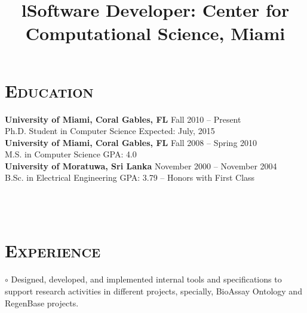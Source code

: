 \begin{resume}



\vspace{-5mm}
\section{\textsc{Education}}

\textbf{University of Miami, Coral Gables, FL} \hfill Fall 2010 -- Present \\
Ph.D. Student in Computer Science \hfill Expected: July, 2015 \\
\newline
\textbf{University of Miami, Coral Gables, FL} \hfill Fall 2008 -- Spring 2010 \\
M.S. in Computer Science \hfill GPA: 4.0 \\
\newline
\textbf{University of Moratuwa, Sri Lanka} \hfill November 2000 -- November 2004 \\ 
B.Sc. in Electrical Engineering \hfill GPA: 3.79 -- Honors with
First Class




\begin{formatb}
  \title{l}\\
  \body\\
\end{formatb}

\vspace{-2mm}
\section{\textsc{Experience}}

\title{\textbf{Software Developer:  Center for Computational Science, Miami}}
\begin{position}
$\circ$ Designed, developed, and implemented internal tools and specifications to support research 
activities in different projects, specially, BioAssay Ontology and RegenBase projects.
\end{position}


\end{resume}
